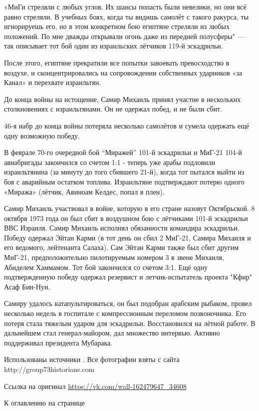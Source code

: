«МиГи стреляли с любых углов. Их шансы попасть были невелики, но они всё равно стреляли. В учебных боях, когда ты видишь самолёт с такого ракурса, ты игнорируешь его, но в этом конкретном бою египтяне стреляли из любых положений. По мне дважды открывали огонь даже из передней полусферы" — так описывает тот бой один из израильских лётчиков 119-й эскадрильи.

После этого, египтяне прекратили все попытки завоевать превосходство в воздухе, и сконцентрировались на сопровождении собственных ударников «за Канал» и перехвате израильтян.

До конца войны на истощение, Самир Михаиль принял участие в нескольких столкновениях с израильтянами. Он не одержал побед, и не были сбит.

46-я иабр до конца войны потеряла несколько самолётов и сумела одержать ещё одну возможную победу.

В феврале 70-го очередной бой “Миражей” 101-й эскадрильи и МиГ-21 104-й авиабригады закончился со счетом 1:1 - теперь уже арабы подловили израильтянина (за минуту до того сбившего 21-й), когда тот пытался выйти из боя с аварийным остатком топлива. Израильтяне подтверждают потерю одного «Миража» (лётчик, Авиноам Келдес, попал в плен).

Самир Михаиль участвовал в войне, которую в его стране назовут Октябрьской. 8 октября 1973 года он был сбит в воздушном бою с лётчиками 101-й эскадрильи ВВС Израиля. Самир Михаиль исполнял обязанности командира эскадрильи. Победу одержал Эйтан Карми (в тот день он сбил 2 МиГ-21, Самира Михаиля и его ведомого, лейтенанта Салаха). Сам Эйтан Карми также был сбит другим МиГ-21, предположительно пилотируемым номером 3 в звене Михаиля, Абиделем Хаммамом. Тот бой закончился со счетом 3:1. Ещё одну подтвержденную победу одержал резервист и летчик-испытатель проекта "Кфир" Асаф Бин-Нун.

Самиру удалось катапультироваться, он был подобран арабским рыбаком, провел несколько недель в госпитале с компрессионным переломом позвоночника. Его потеря стала тяжелым ударом для эскадрильи. Восстановился на лётной работе. В дальнейшем стал генерал-майором, дал множество интервью. Активно поддерживал президента Мубарака. 

Использованы источники \cite{kuper_nikole,kair_hist,segev,skywar,giora}. Все фотографии взяты с сайта http://group73historians.com

Ссылка на оригинал \url{https://vk.com/wall-162479647_34608}

К оглавлению на странице \pageref{tablecont}